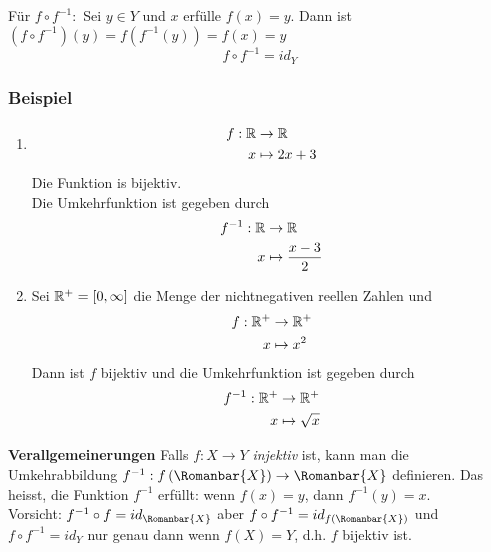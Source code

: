 Für $f\circ f^{-1}:$ Sei $y\in Y$ und $x$ erfülle $f(x)=y$. Dann ist $\left( f\circ f^{-1}\right)(y)=f\left(f^{-1}(y)\right)=f(x)=y$ \[f\circ f^{-1}=id_Y\]

\subsubsection*{Beispiel}
\begin{enumerate}
\item \begin{align*} f:\mathbb{R}&\to\mathbb{R} \\
x&\mapsto 2x+3 \end{align*}
Die Funktion is bijektiv. \\
Die Umkehrfunktion ist gegeben durch \begin{align*}f^{-1}:\mathbb{R}&\to\mathbb{R} \\
x&\mapsto\frac{x-3}{2}\end{align*}
\item Sei $\mathbb{R}^+=\lbrack 0,\infty\rbrack$ die Menge der nichtnegativen reellen Zahlen und \begin{align*}f:\mathbb{R}^+&\to\mathbb{R}^+ \\
x&\mapsto x^2\end{align*}
Dann ist $f$ bijektiv und die Umkehrfunktion  ist gegeben durch \begin{align*}f^{-1}:\mathbb{R}^+&\to\mathbb{R}^+ \\
x&\mapsto\sqrt{x}\end{align*}
\end{enumerate}

\textbf{Verallgemeinerungen}
Falls $f:X\to Y$ \emph{injektiv} ist, kann man die Umkehrabbildung $f^{-1}:f\left(\Romanbar{X}\right)\to\Romanbar{X}$ definieren. Das heisst, die Funktion $f^{-1}$ erfüllt: wenn $f(x)=y$, dann ${f^{-1}(y)=x}$.\\

\noindent Vorsicht: $f^{-1}\circ f=id_{\Romanbar{X}}$ aber $f\circ f^{-1}=id_{f\left(\Romanbar{X}\right)}$ und $f\circ f^{-1}=id_Y$ nur genau dann wenn $f(X)=Y$, d.h. $f$ bijektiv ist.
